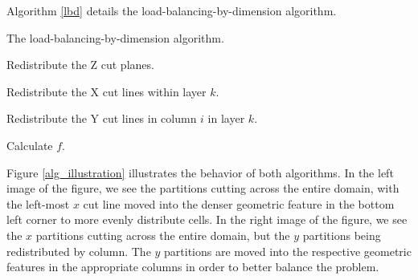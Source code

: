Algorithm \ref{lbd} details the load-balancing-by-dimension algorithm. 
\begin{algorithm}[H]
\caption{The load-balancing-by-dimension algorithm.}
\label{lbd}
\begin{algorithmic}

    \STATE Redistribute the Z cut planes.
  \ENDWHILE  
  
      \STATE Redistribute the X cut lines within layer $k$. 
    \ENDWHILE
  \ENDFOR
  
        \STATE Redistribute the Y cut lines in column $i$ in layer $k$. 
      \ENDWHILE
    \ENDFOR
  \ENDFOR
  
  \STATE Calculate $f$.
\end{algorithmic}
\end{algorithm}

Figure \ref{alg_illustration} illustrates the behavior of both algorithms. In the left image of the figure, we see the partitions cutting across the entire domain, with the left-most $x$ cut line moved into the denser geometric feature in the bottom left corner to more evenly distribute cells. In the right image of the figure, we see the $x$ partitions cutting across the entire domain, but the $y$ partitions being redistributed by column. The $y$ partitions are moved into the respective geometric features in the appropriate columns in order to better balance the problem.

